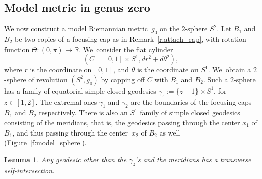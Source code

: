 \documentclass[11pt]{article}
\newcommand{\R}{\mathbb{R}}
\theoremstyle{plain}
\newtheorem{Lemma}[Thm]{Lemma}
\theoremstyle{definition}
\begin{document}
\subsection{Model metric in genus zero}
We now construct a model Riemannian metric~$g_0$ on the $2$-sphere $S^2$.
Let $B_1$ and $B_2$ be two copies of a focusing cap as in Remark~\ref{r:attach_cap}, with rotation function $\Theta:(0,\pi)\to\R$. We~consider the flat cylinder \[
(C=[0,1]\times S^1,dr^2+d\theta^2),
\]
where $r$ is the coordinate on $[0,1]$, and $\theta$ is the coordinate on $S^1$. We~obtain a $2$-sphere of revolution $(S^2,g_0)$ by capping off $C$ with $B_1$ and $B_2$.
Such a $2$-sphere has a family of equatorial simple closed geodesics $\gamma_z:=\{z-1\}\times S^1$, for $z\in[1,2]$. The extremal ones $\gamma_1$ and $\gamma_{2}$ are the boundaries of the focusing caps $B_1$ and $B_2$ respectively. There is also an $S^1$ family of simple closed geodesics consisting of the meridians, that is, the geodesics passing through the center $x_1$ of $B_1$, and thus passing through the center~$x_2$ of $B_2$ as well (Figure~\ref{f:model_sphere}).

\begin{Lemma}\label{l:only_meridians}
Any geodesic other than the $\gamma_z$'s and the meridians has a transverse self-intersection.
\end{Lemma}
\end{document}
